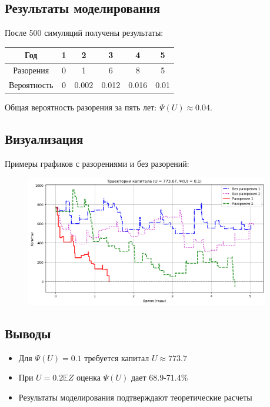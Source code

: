 \documentclass[12pt]{article}
\begin{document}
	\subsection*{Результаты моделирования}
	
	После 500 симуляций получены результаты:
	
	\begin{center}
		\begin{tabular}{cccccc}
			\toprule
			Год & 1 & 2 & 3 & 4 & 5 \\
			\midrule
			Разорения & 0 & 1 & 6 & 8 & 5 \\
			Вероятность & 0 & 0.002 & 0.012 & 0.016 & 0.01 \\
			\bottomrule
		\end{tabular}
	\end{center}
	
	Общая вероятность разорения за пять лет: $\Psi(U) \approx 0.04$.
	
	\subsection*{Визуализация}
	Примеры графиков с разорениями и без разорений:
	\begin{figure}[H]
		\includegraphics[width=0.95\textwidth]{output.png}
	\label{pic:1}
	\end{figure}
	\subsection*{Выводы}
	\begin{itemize}
		\item Для $\Psi(U)=0.1$ требуется капитал $U \approx 773.7$
		\item При $U=0.2\mathbb{E}Z$ оценка $\Psi(U)$ дает 68.9-71.4\%
		\item Результаты моделирования подтверждают теоретические расчеты
	\end{itemize}
	
\end{document}
